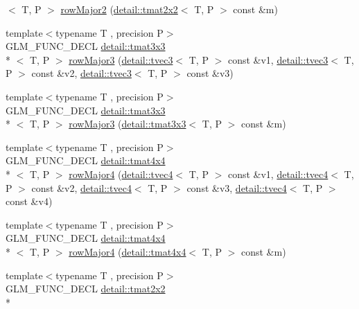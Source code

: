 \begin{DoxyCompactItemize}
$<$ T, P $>$ \hyperlink{group__gtx__matrix__major__storage_ga5e3cee7cdc09b9ebf0e072247a5eac54}{row\-Major2} (\hyperlink{structglm_1_1detail_1_1tmat2x2}{detail\-::tmat2x2}$<$ T, P $>$ const \&m)
\item 
{\footnotesize template$<$typename T , precision P$>$ }\\G\-L\-M\-\_\-\-F\-U\-N\-C\-\_\-\-D\-E\-C\-L \hyperlink{structglm_1_1detail_1_1tmat3x3}{detail\-::tmat3x3}\\*
$<$ T, P $>$ \hyperlink{group__gtx__matrix__major__storage_gaacbbf46215dff1c3da9599916ba04a94}{row\-Major3} (\hyperlink{structglm_1_1detail_1_1tvec3}{detail\-::tvec3}$<$ T, P $>$ const \&v1, \hyperlink{structglm_1_1detail_1_1tvec3}{detail\-::tvec3}$<$ T, P $>$ const \&v2, \hyperlink{structglm_1_1detail_1_1tvec3}{detail\-::tvec3}$<$ T, P $>$ const \&v3)
\item 
{\footnotesize template$<$typename T , precision P$>$ }\\G\-L\-M\-\_\-\-F\-U\-N\-C\-\_\-\-D\-E\-C\-L \hyperlink{structglm_1_1detail_1_1tmat3x3}{detail\-::tmat3x3}\\*
$<$ T, P $>$ \hyperlink{group__gtx__matrix__major__storage_gafb5e7381b2451a85db394c457c284fb7}{row\-Major3} (\hyperlink{structglm_1_1detail_1_1tmat3x3}{detail\-::tmat3x3}$<$ T, P $>$ const \&m)
\item 
{\footnotesize template$<$typename T , precision P$>$ }\\G\-L\-M\-\_\-\-F\-U\-N\-C\-\_\-\-D\-E\-C\-L \hyperlink{structglm_1_1detail_1_1tmat4x4}{detail\-::tmat4x4}\\*
$<$ T, P $>$ \hyperlink{group__gtx__matrix__major__storage_gaba5dbb8fa29fcf57c80daf43ca7cf9db}{row\-Major4} (\hyperlink{structglm_1_1detail_1_1tvec4}{detail\-::tvec4}$<$ T, P $>$ const \&v1, \hyperlink{structglm_1_1detail_1_1tvec4}{detail\-::tvec4}$<$ T, P $>$ const \&v2, \hyperlink{structglm_1_1detail_1_1tvec4}{detail\-::tvec4}$<$ T, P $>$ const \&v3, \hyperlink{structglm_1_1detail_1_1tvec4}{detail\-::tvec4}$<$ T, P $>$ const \&v4)
\item 
{\footnotesize template$<$typename T , precision P$>$ }\\G\-L\-M\-\_\-\-F\-U\-N\-C\-\_\-\-D\-E\-C\-L \hyperlink{structglm_1_1detail_1_1tmat4x4}{detail\-::tmat4x4}\\*
$<$ T, P $>$ \hyperlink{group__gtx__matrix__major__storage_ga1a797d9a3f0d6b81e50b4f1bef2ed281}{row\-Major4} (\hyperlink{structglm_1_1detail_1_1tmat4x4}{detail\-::tmat4x4}$<$ T, P $>$ const \&m)
\item 
{\footnotesize template$<$typename T , precision P$>$ }\\G\-L\-M\-\_\-\-F\-U\-N\-C\-\_\-\-D\-E\-C\-L \hyperlink{structglm_1_1detail_1_1tmat2x2}{detail\-::tmat2x2}\\*

\end{DoxyCompactItemize}
